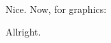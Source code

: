 \paragraph{} Nice. Now, for graphics: \\
\noindent%
\begin{minipage}{\linewidth}
\end{minipage}
Allright.
